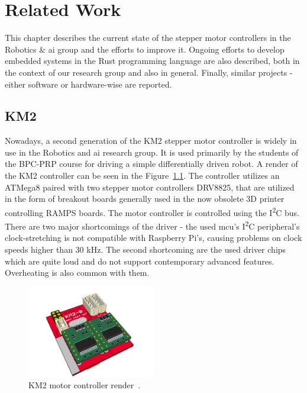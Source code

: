\chapter{Related Work}
\label{ch:related_work}
This chapter describes the current state of the stepper motor controllers in the Robotics \& \acs{ai} group and the efforts to improve it.
Ongoing efforts to develop embedded systems in the Rust programming language are also described, both in the context of our research group and also in general.
Finally, similar projects - either software or hardware-wise are reported.

\section{KM2}
\label{sec:km2}
Nowadays, a second generation of the KM2 stepper motor controller is widely in use in the Robotics and \acs{ai} research group.
It is used primarily by the students of the BPC-PRP course for driving a simple differentially driven robot.
A render of the KM2 controller can be seen in the Figure~\ref{fig:km2render}.
The controller utilizes an ATMega8 paired with two stepper motor controllers DRV8825, that are utilized in the form of breakout boards generally used in the now obsolete 3D printer controlling RAMPS boards.
The motor controller is controlled using the I\textsuperscript{2}C bus.
There are two major shortcomings of the driver - the used \acs{mcu}'s I\textsuperscript{2}C peripheral's clock-stretching is not compatible with Raspberry Pi's, causing problems on clock speeds higher than 30 kHz.
The second shortcoming are the used driver chips which are quite loud and do not support contemporary advanced features.
Overheating is also common with them.

\begin{figure}[H]
    \centering
    \includegraphics[width=0.5\textwidth]{obrazky/km2render}
    \caption{KM2 motor controller render~\cite{burian_km2renderpng_nodate}.}
    \label{fig:km2render}
\end{figure}

